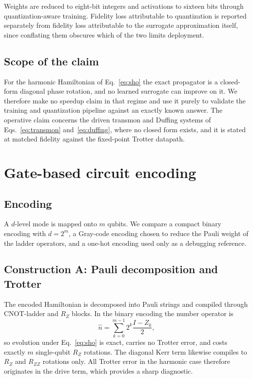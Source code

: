 \documentclass[smallextended]{svjour3}
\begin{document}
Weights are reduced to eight-bit integers and activations to sixteen bits through
quantization-aware training. Fidelity loss attributable to quantization is reported
separately from fidelity loss attributable to the surrogate approximation itself, since
conflating them obscures which of the two limits deployment.

\subsection{Scope of the claim}

For the harmonic Hamiltonian of Eq.~\eqref{eq:sho} the exact propagator is a closed-form
diagonal phase rotation, and no learned surrogate can improve on it. We therefore make
no speedup claim in that regime and use it purely to validate the training and
quantization pipeline against an exactly known answer. The operative claim concerns the
driven transmon and Duffing systems of Eqs.~\eqref{eq:transmon} and~\eqref{eq:duffing},
where no closed form exists, and it is stated at matched fidelity against the fixed-point
Trotter datapath.

\section{Gate-based circuit encoding}
\label{sec:circuit}

\subsection{Encoding}

A $d$-level mode is mapped onto $m$ qubits. We compare a compact binary encoding with
$d = 2^m$, a Gray-code encoding chosen to reduce the Pauli weight of the ladder
operators, and a one-hot encoding used only as a debugging reference.

\subsection{Construction A: Pauli decomposition and Trotter}

The encoded Hamiltonian is decomposed into Pauli strings and compiled through
CNOT-ladder and $R_Z$ blocks. In the binary encoding the number operator is
\begin{equation}
\hat{n} = \sum_{k=0}^{m-1} 2^k \frac{I - Z_k}{2},
\label{eq:numberop}
\end{equation}
so evolution under Eq.~\eqref{eq:sho} is exact, carries no Trotter error, and costs
exactly $m$ single-qubit $R_Z$ rotations. The diagonal Kerr term likewise compiles to
$R_Z$ and $R_{ZZ}$ rotations only. All Trotter error in the harmonic case therefore
originates in the drive term, which provides a sharp diagnostic.
\end{document}
